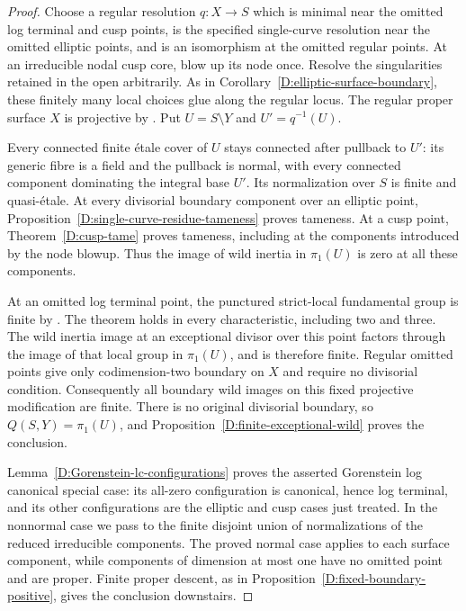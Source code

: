 \begin{proof}
Choose a regular resolution $q:X\to S$ which is minimal near the
omitted log terminal and cusp points, is the specified single-curve
resolution near the omitted elliptic points, and is an isomorphism
at the omitted regular points.  At an irreducible nodal cusp core,
blow up its node once.  Resolve the singularities retained in the
open arbitrarily.  As in Corollary~\ref{D:elliptic-surface-boundary},
these finitely many local choices glue along the regular locus.
The regular proper surface $X$ is projective by
\cite[Lemma 54.16.11, tag 0C5P]{StacksDSurfaceResolution}.
Put $U=S\setminus Y$ and $U'=q^{-1}(U)$.

Every connected finite \'etale cover of $U$ stays connected after
pullback to $U'$: its generic fibre is a field and the pullback is
normal, with every connected component dominating the integral
base $U'$.  Its normalization over $S$ is finite and quasi-\'etale.
At every divisorial boundary component over an elliptic point,
Proposition~\ref{D:single-curve-residue-tameness} proves tameness.
At a cusp point, Theorem~\ref{D:cusp-tame} proves tameness, including
at the components introduced by the node blowup.  Thus the image
of wild inertia in $\pi_1(U)$ is zero at all these components.

At an omitted log terminal point, the punctured strict-local
fundamental group is finite by
\cite[Theorem 5.3, p.~739; see also Corollary 6.4, p.~741]
{CarvajalRojasYasuda2025B}.  The theorem holds in every
characteristic, including two and three.  The wild inertia image
at an exceptional divisor over this point factors through the
image of that local group in $\pi_1(U)$, and is therefore finite.
Regular omitted points give only codimension-two boundary on
$X$ and require no divisorial condition.
Consequently all boundary wild images on this fixed projective
modification are finite.  There is no original divisorial
boundary, so $Q(S,Y)=\pi_1(U)$, and
Proposition~\ref{D:finite-exceptional-wild} proves the conclusion.

Lemma~\ref{D:Gorenstein-lc-configurations} proves the asserted
Gorenstein log canonical special case: its all-zero configuration
is canonical, hence log terminal, and its other configurations
are the elliptic and cusp cases just treated.
In the nonnormal case we pass to the finite disjoint union of
normalizations of the reduced irreducible components.  The proved
normal case applies to each surface component, while components
of dimension at most one have no omitted point and are proper.
Finite proper descent, as in
Proposition~\ref{D:fixed-boundary-positive}, gives the conclusion
downstairs.
\end{proof}
